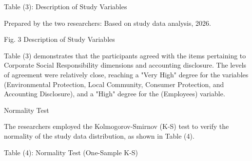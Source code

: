 \documentclass[10pt]{NSP1}
\begin{document}
Table (3): Description of Study Variables

\begin{table}[htbp]
\centering
{}
\caption{}

\end{table}

Prepared by the two researchers: Based on study data analysis, 2026.

Fig. 3 Description of Study Variables

Table (3) demonstrates that the participants agreed with the items pertaining to Corporate Social Responsibility dimensions and accounting disclosure. The levels of agreement were relatively close, reaching a "Very High" degree for the variables (Environmental Protection, Local Community, Consumer Protection, and Accounting Disclosure), and a "High" degree for the (Employees) variable.

Normality Test

The researchers employed the Kolmogorov-Smirnov (K-S) test to verify the normality of the study data distribution, as shown in Table (4).

Table (4): Normality Test (One-Sample K-S)

\begin{table}[htbp]
\centering
{}
\caption{}

\end{table}
\end{document}
